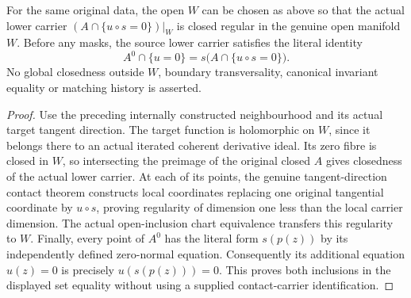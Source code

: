 \begin{theorem}
\label{hir:actual-zero-section-lower-contact-carrier}
\leanok
For the same original data, the open $W$ can be chosen as above so that the actual lower carrier $(A\cap\{u\circ s=0\})|_W$ is closed regular in the genuine open manifold $W$. Before any masks, the source lower carrier satisfies the literal identity
\[
 A^0\cap\{u=0\}=s\bigl(A\cap\{u\circ s=0\}\bigr).
\]
No global closedness outside $W$, boundary transversality, canonical invariant equality or matching history is asserted.
\end{theorem}
\begin{proof}
Use the preceding internally constructed neighbourhood and its actual target tangent direction. The target function is holomorphic on $W$, since it belongs there to an actual iterated coherent derivative ideal. Its zero fibre is closed in $W$, so intersecting the preimage of the original closed $A$ gives closedness of the actual lower carrier. At each of its points, the genuine tangent-direction contact theorem constructs local coordinates replacing one original tangential coordinate by $u\circ s$, proving regularity of dimension one less than the local carrier dimension. The actual open-inclusion chart equivalence transfers this regularity to $W$. Finally, every point of $A^0$ has the literal form $s(p(z))$ by its independently defined zero-normal equation. Consequently its additional equation $u(z)=0$ is precisely $u(s(p(z)))=0$. This proves both inclusions in the displayed set equality without using a supplied contact-carrier identification.
\end{proof}
